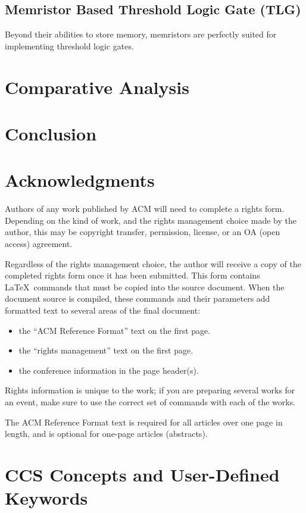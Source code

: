 \documentclass[sigconf,authordraft]{acmart}
\begin{document}
\subsection{Memristor Based Threshold Logic Gate (TLG)}
Beyond their abilities to store memory, memristors are perfectly suited 
for implementing threshold logic gates. 

\section{Comparative Analysis}

\section{Conclusion}

\section{Acknowledgments}

Authors of any work published by ACM will need to complete a rights
form. Depending on the kind of work, and the rights management choice
made by the author, this may be copyright transfer, permission,
license, or an OA (open access) agreement.

Regardless of the rights management choice, the author will receive a
copy of the completed rights form once it has been submitted. This
form contains \LaTeX\ commands that must be copied into the source
document. When the document source is compiled, these commands and
their parameters add formatted text to several areas of the final
document:
\begin{itemize}
\item the ``ACM Reference Format'' text on the first page.
\item the ``rights management'' text on the first page.
\item the conference information in the page header(s).
\end{itemize}

Rights information is unique to the work; if you are preparing several
works for an event, make sure to use the correct set of commands with
each of the works.

The ACM Reference Format text is required for all articles over one
page in length, and is optional for one-page articles (abstracts).

\section{CCS Concepts and User-Defined Keywords}
\end{document}
